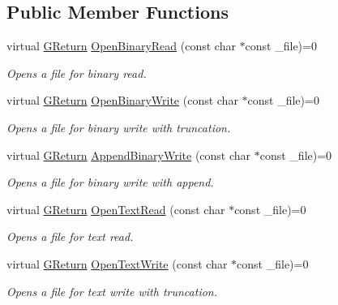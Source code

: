 \subsection*{Public Member Functions}
\begin{DoxyCompactItemize}
\item 
virtual \hyperlink{namespaceGW_a67a839e3df7ea8a5c5686613a7a3de21}{G\+Return} \hyperlink{classGW_1_1SYSTEM_1_1GFile_a2744359d5d258b1b59d139101c6809ce}{Open\+Binary\+Read} (const char $\ast$const \+\_\+file)=0
\begin{DoxyCompactList}\small\item\em Opens a file for binary read. \end{DoxyCompactList}\item 
virtual \hyperlink{namespaceGW_a67a839e3df7ea8a5c5686613a7a3de21}{G\+Return} \hyperlink{classGW_1_1SYSTEM_1_1GFile_a8d5f335bbc6f7c6d798ed27718aa2347}{Open\+Binary\+Write} (const char $\ast$const \+\_\+file)=0
\begin{DoxyCompactList}\small\item\em Opens a file for binary write with truncation. \end{DoxyCompactList}\item 
virtual \hyperlink{namespaceGW_a67a839e3df7ea8a5c5686613a7a3de21}{G\+Return} \hyperlink{classGW_1_1SYSTEM_1_1GFile_a63311236692181f99fd393fe8e1ca9fc}{Append\+Binary\+Write} (const char $\ast$const \+\_\+file)=0
\begin{DoxyCompactList}\small\item\em Opens a file for binary write with append. \end{DoxyCompactList}\item 
virtual \hyperlink{namespaceGW_a67a839e3df7ea8a5c5686613a7a3de21}{G\+Return} \hyperlink{classGW_1_1SYSTEM_1_1GFile_ac3ece72ce30e4d1a1c426c53a7a8354a}{Open\+Text\+Read} (const char $\ast$const \+\_\+file)=0
\begin{DoxyCompactList}\small\item\em Opens a file for text read. \end{DoxyCompactList}\item 
virtual \hyperlink{namespaceGW_a67a839e3df7ea8a5c5686613a7a3de21}{G\+Return} \hyperlink{classGW_1_1SYSTEM_1_1GFile_aebd3e32736b994c0296b7575ab0a2759}{Open\+Text\+Write} (const char $\ast$const \+\_\+file)=0
\begin{DoxyCompactList}\small\item\em Opens a file for text write with truncation. \end{DoxyCompactList}\item 

\end{DoxyCompactItemize}

